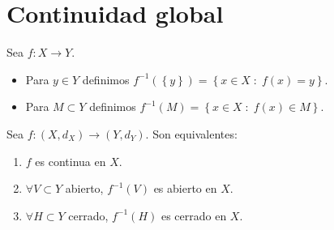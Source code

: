 \section{Continuidad global}
\begin{notation}
Sea $\displaystyle f : X \to Y $. 
\begin{itemize}
	\item Para $\displaystyle y \in Y $ definimos $\displaystyle f^{-1}\left( \left\{ y\right\} \right) = \left\{ x \in X \; : \; f\left(x\right) = y\right\}  $.
	\item Para $\displaystyle M \subset Y $ definimos $\displaystyle f^{-1}\left(M\right) = \left\{ x \in X \; : \; f\left(x\right) \in M\right\}  $.
\end{itemize}
\end{notation}
\begin{theorem}
Sea $\displaystyle f : \left(X, d _{X}\right) \to \left(Y, d _{Y}\right) $. Son equivalentes:
\begin{enumerate}
\item $\displaystyle f $ es continua en $\displaystyle X $.
\item $\displaystyle \forall V \subset Y $ abierto, $\displaystyle f^{-1}\left(V\right) $ es abierto en $\displaystyle X $.
\item $\displaystyle \forall H \subset Y $ cerrado, $\displaystyle f^{-1}\left(H\right) $ es cerrado en $\displaystyle X $.
\end{enumerate}
\end{theorem}
